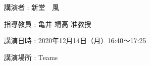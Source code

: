 \documentclass[a4j,10pt,a4paper, fleqn]{jsarticle}\usepackage{stylefile}
\begin{document}
\begin{list}{}{ \itemindent=8mm}
	\renewcommand{\makelabel}{\normalsize}
	\item[\quad 講演者\hfill]: 新堂　風 
	\item[\quad 指導教員\hfill]: 亀井 靖高 准教授
	\item[\quad 講演日時\hfill]: 2020年12月14日（月）16:40～17:25
	\item[\quad 講演場所\hfill]: Teams
\end{list}
\end{document}
